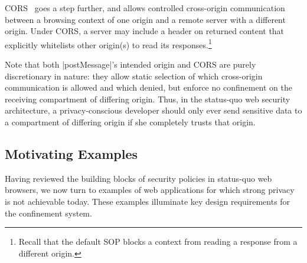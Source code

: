 
CORS~\cite{cors13} goes a step further, and allows controlled
cross-origin communication between a browsing context of one origin
and a remote server with a different origin. Under CORS, a server may
include a header on returned content that explicitly whitelists other
origin(s) to read its responses.\footnote{Recall that the default SOP
  blocks a context from reading a response from a different origin.}

%
 
Note that both \js|postMessage|'s intended origin and CORS are purely
discretionary in nature: they allow static selection of which
cross-origin communication is allowed and which denied, but enforce no
confinement on the receiving compartment of differing origin. Thus, in
the status-quo web security architecture, a privacy-conscious
developer should only ever send sensitive data to a compartment of
differing origin if she completely trusts that origin. 

%

\subsection{Motivating Examples}
\label{sec:motivating-examples}

Having reviewed the building blocks of security policies in status-quo
web browsers, we now turn to examples of web applications for which
strong privacy is not achievable today. %
These examples
illuminate key design requirements for the \sys{} confinement
system. %

